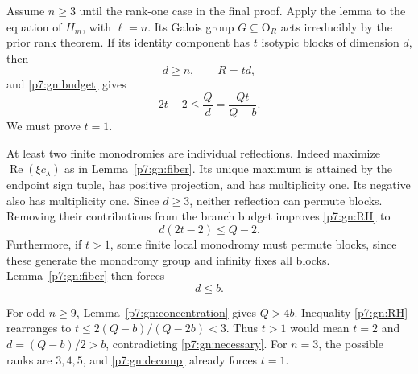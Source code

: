 \documentclass[11pt,a4paper]{article}
\theoremstyle{definition}
\theoremstyle{remark}
\numberwithin{equation}{section}
\begin{document}
Assume $n\ge3$ until the rank-one case in the final proof.
Apply the lemma to the equation of $H_m$, with $\ell=n$.
Its Galois group $G\subseteq\mathrm O_R$ acts irreducibly by
the prior rank theorem. If its identity component has $t$
isotypic blocks of dimension $d$, then
\begin{equation}\label{p7:gn:decomp}
                           d\ge n,\qquad R=td,
\end{equation}
and \eqref{p7:gn:budget} gives
\begin{equation}\label{p7:gn:RH}
                      2t-2\le\frac Qd=\frac{Qt}{Q-b}.
\end{equation}
We must prove $t=1$.

At least two finite monodromies are individual reflections.
Indeed maximize $\operatorname{Re}(\xi c_\lambda)$ as in
Lemma~\ref{p7:gn:fiber}. Its unique maximum is attained by the endpoint
sign tuple, has positive projection, and has multiplicity one.
Its negative also has multiplicity one. Since $d\ge3$, neither
reflection can permute blocks. Removing their contributions from
the branch budget improves \eqref{p7:gn:RH} to
\begin{equation}\label{p7:gn:RHsharp}
                     d(2t-2)\le Q-2.
\end{equation}
Furthermore, if $t>1$, some finite local monodromy must permute
blocks, since these generate the monodromy group and infinity
fixes all blocks. Lemma~\ref{p7:gn:fiber} then forces
\begin{equation}\label{p7:gn:necessary}
                              d\le b.
\end{equation}

For odd $n\ge9$, Lemma~\ref{p7:gn:concentration} gives $Q>4b$.
Inequality \eqref{p7:gn:RH} rearranges to
$t\le2(Q-b)/(Q-2b)<3$. Thus $t>1$ would mean $t=2$ and
$d=(Q-b)/2>b$, contradicting \eqref{p7:gn:necessary}.
For $n=3$, the possible ranks are $3,4,5$, and
\eqref{p7:gn:decomp} already forces $t=1$.
\end{document}
